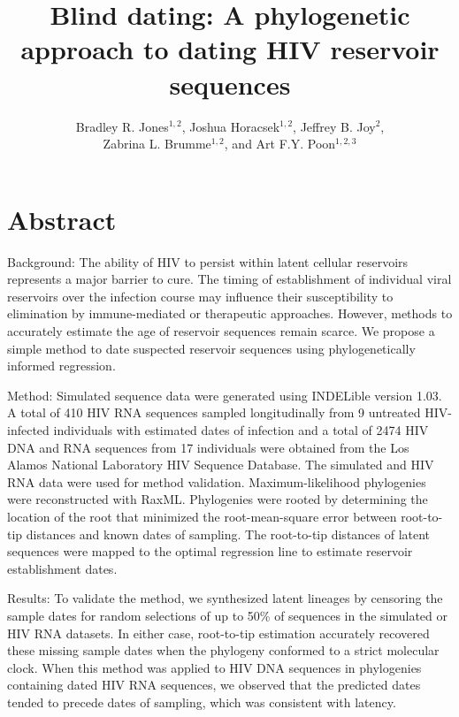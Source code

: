 \documentclass[12pt]{article}
\begin{document}
\title{Blind dating: A phylogenetic approach to dating HIV reservoir sequences}

\author{Bradley R. Jones$^{1,2}$, Joshua Horacsek$^{1,2}$, Jeffrey B. Joy$^2$, \\ Zabrina L. Brumme$^{1,2}$, and Art F.Y. Poon$^{1,2,3}$}
\baselineskip 22pt
\pagewiselinenumbers

\date{}
\maketitle

\section * {Abstract}

Background: 
The ability of HIV to persist within latent cellular reservoirs represents a major barrier to cure. The timing of establishment of individual viral reservoirs over the infection course may influence their susceptibility to elimination by immune-mediated or therapeutic approaches. However, methods to accurately estimate the age of reservoir sequences remain scarce. We propose a simple method to date suspected reservoir sequences using phylogenetically informed regression.

Method: 
Simulated sequence data were generated using INDELible version 1.03. A total of 410 HIV RNA sequences sampled longitudinally from 9 untreated HIV-infected individuals with estimated dates of infection and a total of 2474 HIV DNA and RNA sequences from 17 individuals were obtained from the Los Alamos National Laboratory HIV Sequence Database. The simulated and HIV RNA data were used for method validation. Maximum-likelihood phylogenies were reconstructed with RaxML. Phylogenies were rooted by determining the location of the root that minimized the root-mean-square error between root-to-tip distances and known dates of sampling. The root-to-tip distances of latent sequences were mapped to the optimal regression line to estimate reservoir establishment dates.

Results: 
To validate the method, we synthesized latent lineages by censoring the sample dates for random selections of up to 50\% of sequences in the simulated or HIV RNA datasets. In either case, root-to-tip estimation accurately recovered these missing sample dates when the phylogeny conformed to a strict molecular clock. When this method was applied to HIV DNA sequences in phylogenies containing dated HIV RNA sequences, we observed that the predicted dates tended to precede dates of sampling, which was consistent with latency.
\end{document}
